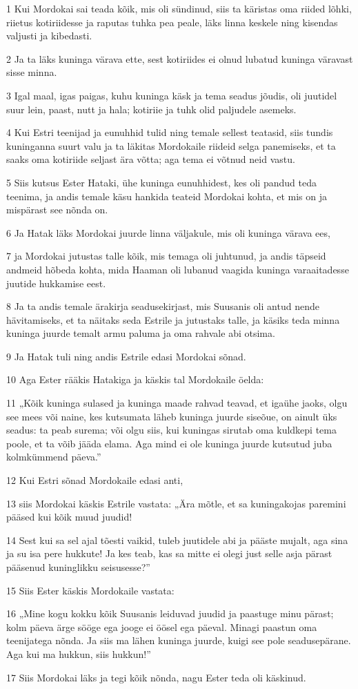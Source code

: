 \par 1 Kui Mordokai sai teada kõik, mis oli sündinud, siis ta käristas oma riided lõhki, riietus kotiriidesse ja raputas tuhka pea peale, läks linna keskele ning kisendas valjusti ja kibedasti.
\par 2 Ja ta läks kuninga värava ette, sest kotiriides ei olnud lubatud kuninga väravast sisse minna.
\par 3 Igal maal, igas paigas, kuhu kuninga käsk ja tema seadus jõudis, oli juutidel suur lein, paast, nutt ja hala; kotiriie ja tuhk olid paljudele asemeks.
\par 4 Kui Estri teenijad ja eunuhhid tulid ning temale sellest teatasid, siis tundis kuninganna suurt valu ja ta läkitas Mordokaile riideid selga panemiseks, et ta saaks oma kotiriide seljast ära võtta; aga tema ei võtnud neid vastu.
\par 5 Siis kutsus Ester Hataki, ühe kuninga eunuhhidest, kes oli pandud teda teenima, ja andis temale käsu hankida teateid Mordokai kohta, et mis on ja mispärast see nõnda on.
\par 6 Ja Hatak läks Mordokai juurde linna väljakule, mis oli kuninga värava ees,
\par 7 ja Mordokai jutustas talle kõik, mis temaga oli juhtunud, ja andis täpseid andmeid hõbeda kohta, mida Haaman oli lubanud vaagida kuninga varaaitadesse juutide hukkamise eest.
\par 8 Ja ta andis temale ärakirja seadusekirjast, mis Suusanis oli antud nende hävitamiseks, et ta näitaks seda Estrile ja jutustaks talle, ja käsiks teda minna kuninga juurde temalt armu paluma ja oma rahvale abi otsima.
\par 9 Ja Hatak tuli ning andis Estrile edasi Mordokai sõnad.
\par 10 Aga Ester rääkis Hatakiga ja käskis tal Mordokaile öelda:
\par 11 „Kõik kuninga sulased ja kuninga maade rahvad teavad, et igaühe jaoks, olgu see mees või naine, kes kutsumata läheb kuninga juurde siseõue, on ainult üks seadus: ta peab surema; või olgu siis, kui kuningas sirutab oma kuldkepi tema poole, et ta võib jääda elama. Aga mind ei ole kuninga juurde kutsutud juba kolmkümmend päeva.”
\par 12 Kui Estri sõnad Mordokaile edasi anti,
\par 13 siis Mordokai käskis Estrile vastata: „Ära mõtle, et sa kuningakojas paremini pääsed kui kõik muud juudid!
\par 14 Sest kui sa sel ajal tõesti vaikid, tuleb juutidele abi ja pääste mujalt, aga sina ja su isa pere hukkute! Ja kes teab, kas sa mitte ei olegi just selle asja pärast pääsenud kuninglikku seisusesse?”
\par 15 Siis Ester käskis Mordokaile vastata:
\par 16 „Mine kogu kokku kõik Suusanis leiduvad juudid ja paastuge minu pärast; kolm päeva ärge sööge ega jooge ei öösel ega päeval. Minagi paastun oma teenijatega nõnda. Ja siis ma lähen kuninga juurde, kuigi see pole seadusepärane. Aga kui ma hukkun, siis hukkun!”
\par 17 Siis Mordokai läks ja tegi kõik nõnda, nagu Ester teda oli käskinud.

